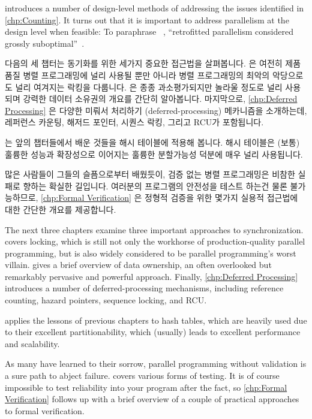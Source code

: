 introduces a number of design-level methods of addressing the issues
identified in \cref{chp:Counting}.
It turns out that it is important to address parallelism at
the design level when feasible:
To paraphrase ~\cite{Dijkstra:1968:LEG:362929.362947},
``retrofitted parallelism considered grossly
suboptimal''~\cite{PaulEMcKenney2012HOTPARsuboptimal}.

\fi

다음의 세 챕터는 동기화를 위한 세가지 중요한 접근법을 살펴봅니다.
 은 여전히 제품 품질 병렬 프로그래밍에 널리 사용될
뿐만 아니라 병렬 프로그래밍의 최악의 악당으로도 널리 여겨지는 락킹을 다룹니다.
 은 종종 과소평가되지만 놀라울 정도로 널리
사용되며 강력한 데이터 소유권의 개요를 간단히 알아봅니다.
마지막으로, \cref{chp:Deferred Processing} 은 다양한 미뤄서 처리하기
(deferred-processing) 메카니즘을 소개하는데, 레퍼런스 카운팅, 해저드 포인터,
시퀀스 락킹, 그리고 RCU가 포함됩니다.

 는 앞의 챕터들에서 배운 것들을 해시 테이블에
적용해 봅니다.  해시 테이블은 (보통) 훌륭한 성능과 확장성으로 이어지는 훌륭한
분할가능성 덕분에 매우 널리 사용됩니다.

많은 사람들이 그들의 슬픔으로부터 배웠듯이, 검증 없는 병렬 프로그래밍은 비참한
실패로 향하는 확실한 길입니다.
여러분의 프로그램의 안전성을 테스트 하는건 물론 불가능하므로,
\cref{chp:Formal Verification} 은 정형적 검증을 위한 몇가지 실용적
접근법에 대한 간단한 개요를 제공합니다.

\iffalse

The next three chapters examine three important approaches to
synchronization.
 covers locking, which is still not only the
workhorse of production-quality parallel programming, but is also widely
considered to be parallel programming's worst villain.
 gives a brief overview of data ownership,
an often overlooked but remarkably pervasive and powerful approach.
Finally, \cref{chp:Deferred Processing} introduces a number of
deferred-processing mechanisms, including reference counting,
hazard pointers, sequence locking, and RCU\@.

 applies the lessons of previous
chapters to hash tables, which are heavily used due
to their excellent partitionability, which (usually) leads to excellent
performance and scalability.

As many have learned to their sorrow, parallel programming without
validation is a sure path to abject failure.
 covers various forms of testing.
It is of course impossible to test reliability into your program
after the fact, so \cref{chp:Formal Verification}
follows up with a brief overview of a couple of practical approaches to
formal verification.

